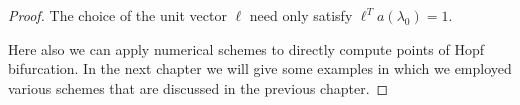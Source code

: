 \begin{proof}
The choice of the unit vector $\ell$ need only satisfy $\ell^T
a(\lambda_0) = 1$. 

Here also we can apply numerical schemes to directly compute points
of Hopf bifurcation. In the next chapter we will give some examples in
which we employed various schemes that are discussed in the previous
chapter. 
\end{proof}
